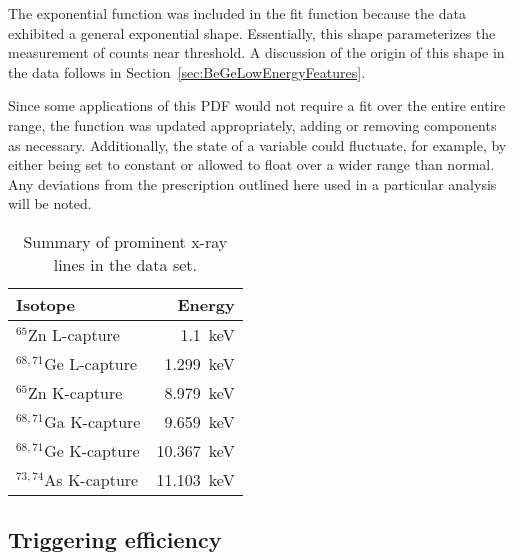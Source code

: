 The exponential function was included in the fit function because the data exhibited a general exponential shape.  Essentially, this shape parameterizes the measurement of counts near threshold.  A discussion of the origin of this shape in the data follows in Section~\ref{sec:BeGeLowEnergyFeatures}.  

Since some applications of this PDF would not require a fit over the entire entire range, the function was updated appropriately, adding or removing components as necessary.  Additionally, the state of a variable could fluctuate, for example, by either being set to constant or allowed to float over a wider range than normal.  Any deviations from the prescription outlined here used in a particular analysis will be noted.  

			\begin{table}
			\centering
				\begin{tabular}{l r}
					\toprule
					Isotope & Energy \\
					\midrule
					$^{65}$Zn L-capture & 1.1~keV \\
					$^{68,71}$Ge L-capture & 1.299~keV \\
					$^{65}$Zn K-capture & 8.979~keV \\
					$^{68,71}$Ga K-capture & 9.659~keV \\
					$^{68,71}$Ge K-capture & 10.367~keV \\
					$^{73,74}$As K-capture & 11.103~keV \\
					\bottomrule
				\end{tabular}	
				\caption[Summary of prominent x-ray lines in the BeGe data set]
				{Summary of prominent x-ray lines in the data set.}
				\label{tab:XRayLines}
			\end{table}	
	
		\subsection{Triggering efficiency}
		\label{sec:BeGeTrigEff}

